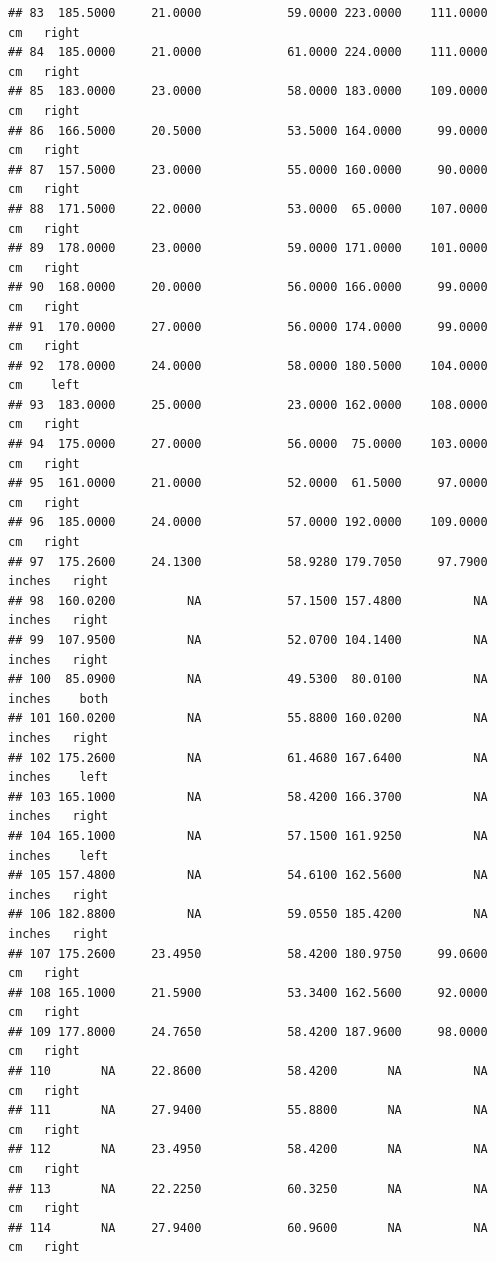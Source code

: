\documentclass[]{article}
\begin{document}
\begin{verbatim}
## 83  185.5000     21.0000            59.0000 223.0000    111.0000     cm   right
## 84  185.0000     21.0000            61.0000 224.0000    111.0000     cm   right
## 85  183.0000     23.0000            58.0000 183.0000    109.0000     cm   right
## 86  166.5000     20.5000            53.5000 164.0000     99.0000     cm   right
## 87  157.5000     23.0000            55.0000 160.0000     90.0000     cm   right
## 88  171.5000     22.0000            53.0000  65.0000    107.0000     cm   right
## 89  178.0000     23.0000            59.0000 171.0000    101.0000     cm   right
## 90  168.0000     20.0000            56.0000 166.0000     99.0000     cm   right
## 91  170.0000     27.0000            56.0000 174.0000     99.0000     cm   right
## 92  178.0000     24.0000            58.0000 180.5000    104.0000     cm    left
## 93  183.0000     25.0000            23.0000 162.0000    108.0000     cm   right
## 94  175.0000     27.0000            56.0000  75.0000    103.0000     cm   right
## 95  161.0000     21.0000            52.0000  61.5000     97.0000     cm   right
## 96  185.0000     24.0000            57.0000 192.0000    109.0000     cm   right
## 97  175.2600     24.1300            58.9280 179.7050     97.7900 inches   right
## 98  160.0200          NA            57.1500 157.4800          NA inches   right
## 99  107.9500          NA            52.0700 104.1400          NA inches   right
## 100  85.0900          NA            49.5300  80.0100          NA inches    both
## 101 160.0200          NA            55.8800 160.0200          NA inches   right
## 102 175.2600          NA            61.4680 167.6400          NA inches    left
## 103 165.1000          NA            58.4200 166.3700          NA inches   right
## 104 165.1000          NA            57.1500 161.9250          NA inches    left
## 105 157.4800          NA            54.6100 162.5600          NA inches   right
## 106 182.8800          NA            59.0550 185.4200          NA inches   right
## 107 175.2600     23.4950            58.4200 180.9750     99.0600     cm   right
## 108 165.1000     21.5900            53.3400 162.5600     92.0000     cm   right
## 109 177.8000     24.7650            58.4200 187.9600     98.0000     cm   right
## 110       NA     22.8600            58.4200       NA          NA     cm   right
## 111       NA     27.9400            55.8800       NA          NA     cm   right
## 112       NA     23.4950            58.4200       NA          NA     cm   right
## 113       NA     22.2250            60.3250       NA          NA     cm   right
## 114       NA     27.9400            60.9600       NA          NA     cm   right

\end{verbatim}
\end{document}

